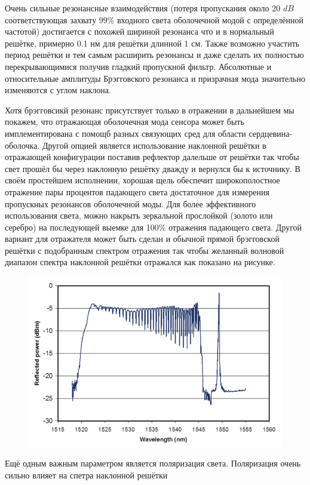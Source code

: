 Очень сильные  резонансные взаимодействия (потеря пропускания около 20 $dB$ соответствующая захвату  $ 99\%   $ входного света оболочечной модой с определённой частотой) достигается с похожей шириной резонанса что и в нормальный решётке, примерно 0.1 нм для решётки длинной 1 см. Также возможно участить период решётки и тем самым расширить резонансы и даже сделать их полностью перекрывающимися получив гладкий пропускной фильтр. Абсолютные и относительные  амплитуды Брэгговского резонанса и призрачная мода значительно изменяются с углом наклона.

\par

Хотя брэгговсикй резонанс присутствует только в отражении в дальнейшем мы покажем, что отражающая оболочечная мода сенсора может быть имплементирована с помощб разных связующих сред для области сердцевина-оболочка. Другой опцией является использование наклонной решётки в отражающей конфигурации поставив рефлектор далельше от решётки так чтобы свет прошёл бы через наклонную решётку дважду и вернулся бы к источнику. В своём простейшем исполнении, хорошая щель обеспечит широкополостное отражение пары процентов падающего света достаточное для измерения пропускных резонансов оболочечной моды. Для более эффективного использования света, можно накрыть зеркальной прослойкой (золото или серебро) на последующей выемке для 100\% отражения падающего света. Другой вариант для отражателя может быть сделан и обычной прямой брэгговской решётки с подобранным спектром отражения так чтобы желанный волновой диапазон спектра наклонной решётки отражался как показано на рисунке.

\begin{figure}[h]
	\centering
	\includegraphics[width=0.7\linewidth]{screenshot007}
	\caption{}
	\label{fig:screenshot007}
\end{figure}

\par 
Ещё одным важным параметром является поляризация света. Поляризация очень сильно влияет на спетра наклонной решётки










